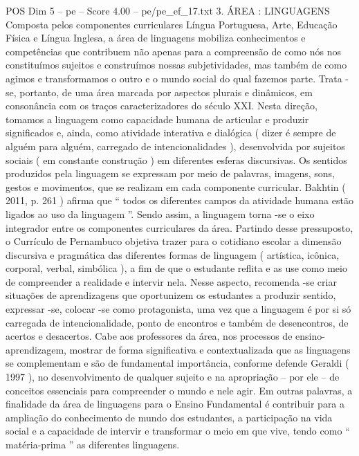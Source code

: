 \begin{textsample}{POS Dim 5 – pe – Score 4.00 – pe/pe\_ef\_17.txt}  \label{ex:f5_pos_209}
3.
ÁREA : LINGUAGENS Composta pelos componentes curriculares Língua Portuguesa, Arte, Educação Física e Língua Inglesa, a área de linguagens mobiliza conhecimentos e competências que contribuem não apenas para a compreensão de como nós nos constituímos sujeitos e construímos nossas subjetividades, mas também de como agimos e transformamos o outro e o mundo social do qual fazemos parte.
Trata -se, portanto, de uma área marcada por aspectos plurais e dinâmicos, em consonância com os traços caracterizadores do século XXI.
Nesta direção, tomamos a linguagem como capacidade humana de articular e produzir significados e, ainda, como atividade interativa e dialógica ( dizer é sempre de alguém para alguém, carregado de intencionalidades ), desenvolvida por sujeitos sociais ( em constante construção ) em diferentes esferas discursivas.
Os sentidos produzidos pela linguagem se expressam por meio de palavras, imagens, sons, gestos e movimentos, que se realizam em cada componente curricular.
Bakhtin ( 2011, p. 261 ) afirma que “ todos os diferentes campos da atividade humana estão ligados ao uso da linguagem ”.
Sendo assim, a linguagem torna -se o eixo integrador entre os componentes curriculares da área.
Partindo desse pressuposto, o Currículo de Pernambuco objetiva trazer para o cotidiano escolar a dimensão discursiva e pragmática das diferentes formas de linguagem ( artística, icônica, corporal, verbal, simbólica ), a fim de que o estudante reflita e as use como meio de compreender a realidade e intervir nela.
Nesse aspecto, recomenda -se criar situações de aprendizagens que oportunizem os estudantes a produzir sentido, expressar -se, colocar -se como protagonista, uma vez que a linguagem é por si só carregada de intencionalidade, ponto de encontros e também de desencontros, de acertos e desacertos.
Cabe aos professores da área, nos processos de ensino-aprendizagem, mostrar de forma significativa e contextualizada que as linguagens se complementam e são de fundamental importância, conforme defende Geraldi ( 1997 ), no desenvolvimento de qualquer sujeito e na apropriação – por ele – de conceitos essenciais para compreender o mundo e nele agir.
Em outras palavras, a finalidade da área de linguagens para o Ensino Fundamental é contribuir para a ampliação do conhecimento de mundo dos estudantes, a participação na vida social e a capacidade de intervir e transformar o meio em que vive, tendo como “ matéria-prima ” as diferentes linguagens.

\end{textsample}

